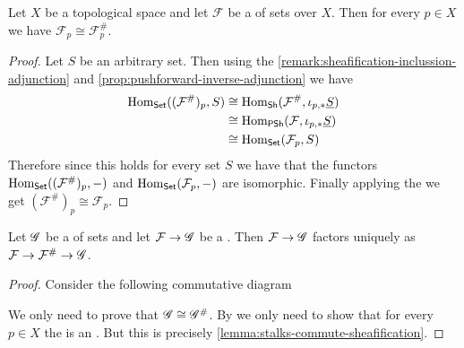 \documentclass[../main.tex]{subfiles}
\begin{document}
\begin{lemma} \label{lemma:stalks-commute-sheafification}
  Let \(X\) be a topological space and let \(\mathcal{F}\) be a  of sets over \(X\). Then for every \(p \in X\) we have \(\mathcal{F}_{p} \cong \mathcal{F}_{p}^{\#}\).
\end{lemma}
\begin{proof}
  Let \(S\) be an arbitrary set.
  Then using the  \autoref{remark:sheafification-inclussion-adjunction} and \autoref{prop:pushforward-inverse-adjunction} we have
  \begin{align*}
    \operatorname{Hom}_{\mathsf{Set}}((\mathcal{F}^{\#})_{p}, S) &\cong \operatorname{Hom}_{\mathsf{Sh}}(\mathcal{F}^{\#}, \iota_{p, \ast}\underline{S}) \\
                                 &\cong \operatorname{Hom}_{\mathsf{PSh}}(\mathcal{F}, \iota_{p, \ast}\underline{S}) \\
                                 &\cong \operatorname{Hom}_{\mathsf{Set}}(\mathcal{F}_{p}, S)
  \end{align*}
  Therefore since this holds for every set \(S\) we have that the functors \(\operatorname{Hom}_{\mathsf{Set}}((\mathcal{F}^{\#})_{p}, -)\) and \(\operatorname{Hom}_{\mathsf{Set}}(\mathcal{F}_{p}, -)\) are isomorphic.
  Finally applying the  we get \((\mathcal{F}^{\#})_{p} \cong \mathcal{F}_{p}\).
\end{proof}


\begin{lemma}
  Let \(\mathscr{G}\) be a  of sets and let \(\mathcal{F} \to \mathscr{G}\) be a . Then \(\mathcal{F} \to \mathscr{G}\) factors uniquely as \(\mathcal{F} \to \mathcal{F}^{\#} \to \mathscr{G}\).
\end{lemma}
\begin{proof}
  Consider the following commutative diagram
  \begin{center}
  \end{center}
  We only need to prove that \(\mathscr{G} \cong \mathscr{G}^{\#}\).
  By  we only need to show that for every \(p \in X\) the  is an .
  But this is precisely \autoref{lemma:stalks-commute-sheafification}.
\end{proof}

\end{document}
